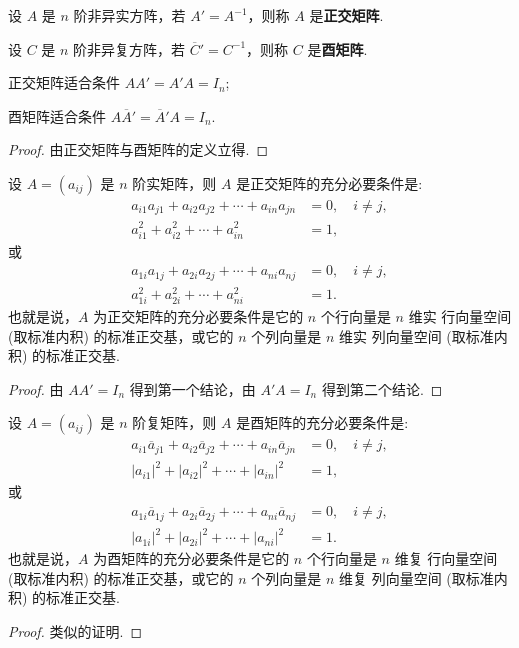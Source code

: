 \documentclass[../../main.tex]{subfiles}
\begin{document}
\begin{definition}[正交矩阵和酉矩阵]
设 $A$ 是 $n$ 阶非异实方阵，若 $A' = A^{-1}$，则称 $A$ 是\textbf{正交矩阵}. 

设 $C$ 是 $n$ 阶非异复方阵，若 $\overline{C}' = C^{-1}$，则称 $C$ 是\textbf{酉矩阵}.
\end{definition}

\begin{theorem}
正交矩阵适合条件 $AA' = A'A = I_n$;

酉矩阵适合条件 $A\overline{A}' = \overline{A}'A = I_n$.
\end{theorem}
\begin{proof}
由正交矩阵与酉矩阵的定义立得.

\end{proof}

\begin{theorem}\label{theorem:正交矩阵的基本性质1}
设 $A = (a_{ij})$ 是 $n$ 阶实矩阵，则 $A$ 是正交矩阵的充分必要条件是:
\begin{align*}
a_{i1}a_{j1} + a_{i2}a_{j2} + \cdots + a_{in}a_{jn} &= 0,\quad i \neq j,\\
a_{i1}^2 + a_{i2}^2 + \cdots + a_{in}^2 &= 1,
\end{align*}
或
\begin{align*}
a_{1i}a_{1j} + a_{2i}a_{2j} + \cdots + a_{ni}a_{nj} &= 0,\quad i \neq j,\\
a_{1i}^2 + a_{2i}^2 + \cdots + a_{ni}^2 &= 1.
\end{align*}
也就是说，$A$ 为正交矩阵的充分必要条件是它的 $n$ 个行向量是 $n$ 维实 行向量空间 (取标准内积) 的标准正交基，或它的 $n$ 个列向量是 $n$ 维实 列向量空间 (取标准内积) 的标准正交基.
\end{theorem}
\begin{proof}
由 $AA' = I_n$ 得到第一个结论，由 $A'A = I_n$ 得到第二个结论.

\end{proof}

\begin{theorem}\label{theorem:酉矩阵的基本性质1}
设 $A = (a_{ij})$ 是 $n$ 阶复矩阵，则 $A$ 是酉矩阵的充分必要条件是:
\begin{align*}
a_{i1}\overline{a}_{j1} + a_{i2}\overline{a}_{j2} + \cdots + a_{in}\overline{a}_{jn} &= 0,\quad i \neq j,\\
|a_{i1}|^2 + |a_{i2}|^2 + \cdots + |a_{in}|^2 &= 1,
\end{align*}
或
\begin{align*}
a_{1i}\overline{a}_{1j} + a_{2i}\overline{a}_{2j} + \cdots + a_{ni}\overline{a}_{nj} &= 0,\quad i \neq j,\\
|a_{1i}|^2 + |a_{2i}|^2 + \cdots + |a_{ni}|^2 &= 1.
\end{align*}
也就是说，$A$ 为酉矩阵的充分必要条件是它的 $n$ 个行向量是 $n$ 维复 行向量空间 (取标准内积) 的标准正交基，或它的 $n$ 个列向量是 $n$ 维复 列向量空间 (取标准内积) 的标准正交基.
\end{theorem}
\begin{proof}
类似的证明.

\end{proof}
\end{document}
